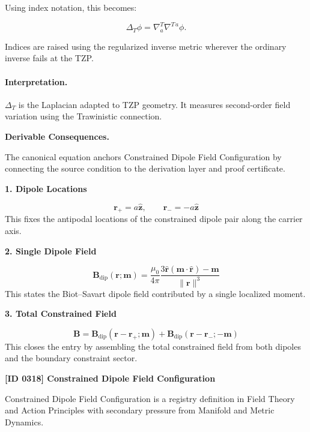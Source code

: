 Using index notation, this becomes:

\begin{equation}
\boxed{
\Delta_T\phi
=
\nabla^{T}_{a}\nabla^{T\,a}\phi .
}
\end{equation}

Indices are raised using the regularized inverse metric wherever the ordinary inverse fails at the TZP.

\paragraph{Interpretation.}
$\Delta_T$ is the Laplacian adapted to TZP geometry. It measures second-order field variation using the Trawinistic connection.

\par\vspace{0.35em}
\noindent\textbf{Derivable Consequences.}\quad
\begingroup
\footnotesize
\raggedright
The canonical equation anchors Constrained Dipole Field Configuration by connecting the source condition to the derivation layer and proof certificate.
\par\endgroup

\noindent\textbf{1. Dipole Locations}\par
\[
\mathbf{r}_{+}=a\hat{\mathbf{z}},\qquad \mathbf{r}_{-}=-a\hat{\mathbf{z}}
\]
\noindent This fixes the antipodal locations of the constrained dipole pair along the carrier axis.\par
\noindent\textbf{2. Single Dipole Field}\par
\[
\mathbf{B}_{\mathrm{dip}}(\mathbf{r};\mathbf{m})=\frac{\mu_{0}}{4\pi}\frac{3\hat{\mathbf{r}}(\mathbf{m}\cdot\hat{\mathbf{r}})-\mathbf{m}}{\lVert\mathbf{r}\rVert^{3}}
\]
\noindent This states the Biot--Savart dipole field contributed by a single localized moment.\par
\noindent\textbf{3. Total Constrained Field}\par
\[
\mathbf{B}=\mathbf{B}_{\mathrm{dip}}(\mathbf{r}-\mathbf{r}_{+};\mathbf{m})+\mathbf{B}_{\mathrm{dip}}(\mathbf{r}-\mathbf{r}_{-};-\mathbf{m})
\]
\noindent This closes the entry by assembling the total constrained field from both dipoles and the boundary constraint sector.\par

\clearpage
\noindent\textbf{[ID 0318] Constrained Dipole Field Configuration}\par
\vspace{0.35em}
\begingroup\small
{}
Constrained Dipole Field Configuration is a registry definition in Field Theory and Action Principles with secondary pressure from Manifold and Metric Dynamics.

